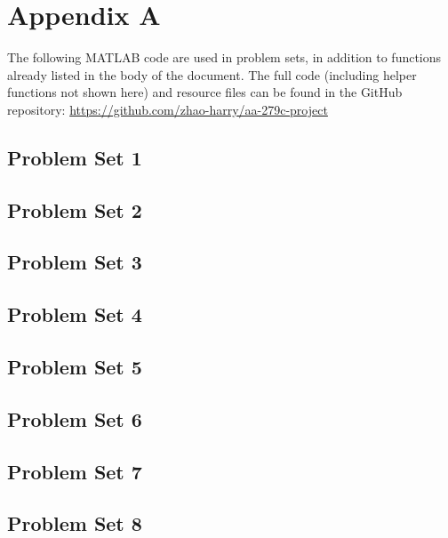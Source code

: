 \appendix

\section{Appendix A}
The following MATLAB code are used in problem sets, in addition to functions already listed in the body of the document. The full code (including helper functions not shown here) and resource files can be found in the GitHub repository: \url{https://github.com/zhao-harry/aa-279c-project}

\subsection{Problem Set 1}


\newpage
\subsection{Problem Set 2}








\newpage
\subsection{Problem Set 3}



\newpage
\subsection{Problem Set 4}


\newpage
\subsection{Problem Set 5}







\newpage
\subsection{Problem Set 6}


\newpage
\subsection{Problem Set 7}


\newpage
\subsection{Problem Set 8}
